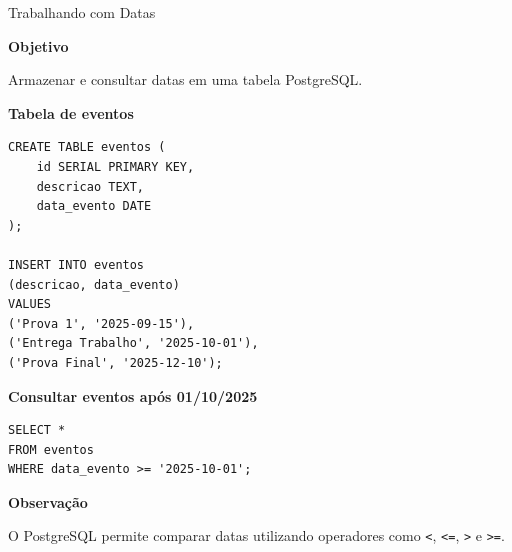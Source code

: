 \documentclass{beamer}
\begin{document}
\begin{frame}[fragile]{Trabalhando com Datas}

\textbf{Objetivo}

Armazenar e consultar datas em uma tabela PostgreSQL.

\vspace{0.3cm}

\textbf{Tabela de eventos}

\begin{verbatim}
CREATE TABLE eventos (
    id SERIAL PRIMARY KEY,
    descricao TEXT,
    data_evento DATE
);

INSERT INTO eventos
(descricao, data_evento)
VALUES
('Prova 1', '2025-09-15'),
('Entrega Trabalho', '2025-10-01'),
('Prova Final', '2025-12-10');
\end{verbatim}

\vspace{0.2cm}

\textbf{Consultar eventos após 01/10/2025}

\begin{verbatim}
SELECT *
FROM eventos
WHERE data_evento >= '2025-10-01';
\end{verbatim}

\vspace{0.2cm}

\textbf{Observação}

O PostgreSQL permite comparar datas utilizando operadores como
\texttt{<}, \texttt{<=}, \texttt{>} e \texttt{>=}.

\end{frame}
\end{document}
